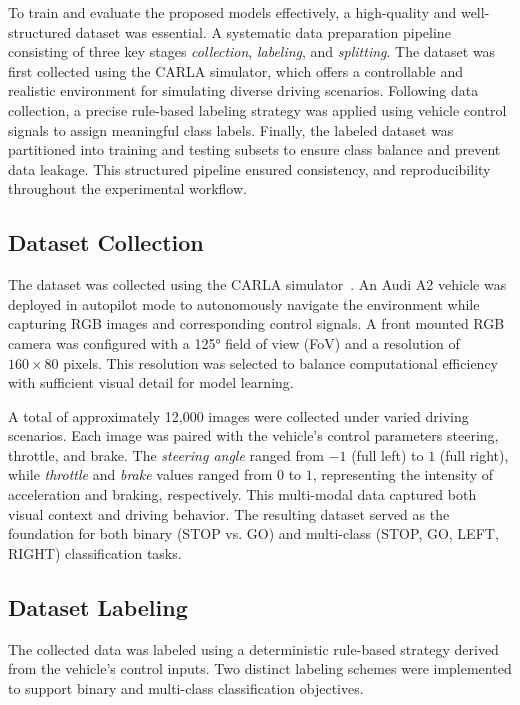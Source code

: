 To train and evaluate the proposed models effectively, a high-quality and well-structured dataset was essential. A systematic data preparation pipeline consisting of three key stages \textit{collection}, \textit{labeling}, and \textit{splitting}. The dataset was first collected using the CARLA simulator, which offers a controllable and realistic environment for simulating diverse driving scenarios. Following data collection, a precise rule-based labeling strategy was applied using vehicle control signals to assign meaningful class labels. Finally, the labeled dataset was partitioned into training and testing subsets to ensure class balance and prevent data leakage. This structured pipeline ensured consistency, and reproducibility  throughout the experimental workflow.

\subsection{Dataset Collection}

The dataset was collected using the CARLA simulator~\cite{CARLA2024docs}. An Audi A2 vehicle was deployed in autopilot mode to autonomously navigate the environment while capturing RGB images and corresponding control signals. A front mounted RGB camera was configured with a 125° field of view (FoV) and a resolution of $160 \times 80$ pixels. This resolution was selected to balance computational efficiency with sufficient visual detail for model learning.

A total of approximately 12,000 images were collected under varied driving scenarios. Each image was paired with the vehicle’s control parameters steering, throttle, and brake. The \textit{steering angle} ranged from $-1$ (full left) to $1$ (full right), while \textit{throttle} and \textit{brake} values ranged from $0$ to $1$, representing the intensity of acceleration and braking, respectively. This multi-modal data captured both visual context and driving behavior. The resulting dataset served as the foundation for both binary (STOP vs. GO) and multi-class (STOP, GO, LEFT, RIGHT) classification tasks.


\subsection{Dataset Labeling}

The collected data was labeled using a deterministic rule-based strategy derived from the vehicle’s control inputs. Two distinct labeling schemes were implemented to support binary and multi-class classification objectives.

